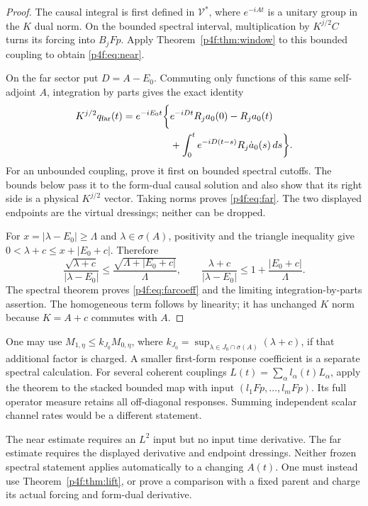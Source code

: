 \documentclass[11pt]{article}
\numberwithin{equation}{section}
\theoremstyle{definition}
\theoremstyle{remark}
\begin{document}
\begin{proof}
The causal integral is first defined in $\mathcal V^*$,
where $e^{-iAt}$ is a unitary group in the $K$ dual
norm. On the bounded spectral interval, multiplication
by $K^{j/2}C$ turns its forcing into $B_jFp$.
Apply Theorem~\ref{p4f:thm:window} to this bounded
coupling to obtain \eqref{p4f:eq:near}.

On the far sector put $D=A-E_0$. Commuting only
functions of this same self-adjoint $A$, integration
by parts gives the exact identity
\begin{align}
 K^{j/2}q_{\rm far}(t)
 =e^{-iE_0t}\bigg\{
 &e^{-iDt}R_j a_0(0)-R_j a_0(t)\notag\\
 &+\int_0^t e^{-iD(t-s)}R_j\dot a_0(s)\,ds\bigg\}.
 \label{p4f:eq:faridentity}
\end{align}
For an unbounded coupling, prove it first on bounded
spectral cutoffs. The bounds below pass it to the
form-dual causal solution and also show that its
right side is a physical $K^{j/2}$ vector.
Taking norms proves \eqref{p4f:eq:far}.
The two displayed endpoints are the virtual
dressings; neither can be dropped.

For $x=|\lambda-E_0|\ge\Lambda$ and
$\lambda\in\sigma(A)$, positivity and the triangle
inequality give
$0<\lambda+c\le x+|E_0+c|$. Therefore
\[
 \frac{\sqrt{\lambda+c}}{|\lambda-E_0|}
 \le\frac{\sqrt{\Lambda+|E_0+c|}}{\Lambda},
 \qquad
 \frac{\lambda+c}{|\lambda-E_0|}
 \le1+\frac{|E_0+c|}{\Lambda}.
 \]
The spectral theorem proves \eqref{p4f:eq:farcoeff}
and the limiting integration-by-parts assertion.
The homogeneous term follows by linearity; it has
unchanged $K$ norm because $K=A+c$ commutes with $A$.
\end{proof}

One may use $M_{1,\eta}\le k_{J_0}M_{0,\eta}$, where
$k_{J_0}=\sup_{\lambda\in J_0\cap\sigma(A)}(\lambda+c)$,
if that additional factor is charged. A smaller
first-form response coefficient is a separate spectral
calculation. For several coherent couplings
$L(t)=\sum_\alpha l_\alpha(t)L_\alpha$, apply the theorem
to the stacked bounded map with input
$(l_1Fp,\ldots,l_mFp)$. Its full operator measure retains
all off-diagonal responses. Summing independent scalar
channel rates would be a different statement.

The near estimate requires an $L^2$ input but no
input time derivative. The far estimate requires the
displayed derivative and endpoint dressings. Neither
frozen spectral statement applies automatically to
a changing $A(t)$. One must instead use
Theorem~\ref{p4f:thm:lift}, or prove a comparison with
a fixed parent and charge its actual forcing and
form-dual derivative.
\end{document}
